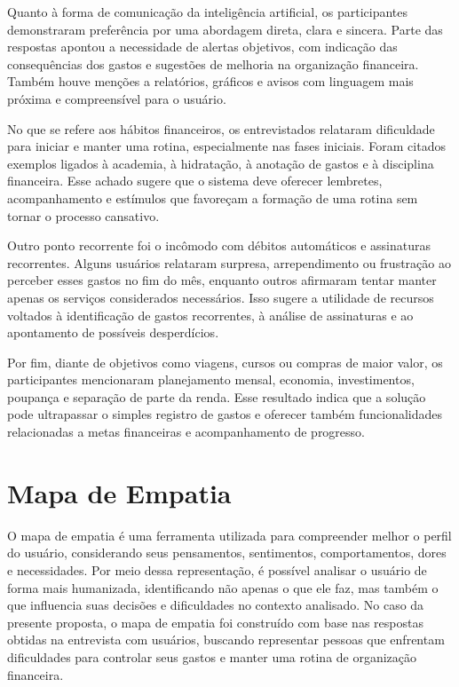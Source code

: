 Quanto à forma de comunicação da inteligência artificial, os participantes demonstraram preferência por uma abordagem direta, clara e sincera. Parte das respostas apontou a necessidade de alertas objetivos, com indicação das consequências dos gastos e sugestões de melhoria na organização financeira. Também houve menções a relatórios, gráficos e avisos com linguagem mais próxima e compreensível para o usuário.

No que se refere aos hábitos financeiros, os entrevistados relataram dificuldade para iniciar e manter uma rotina, especialmente nas fases iniciais. Foram citados exemplos ligados à academia, à hidratação, à anotação de gastos e à disciplina financeira. Esse achado sugere que o sistema deve oferecer lembretes, acompanhamento e estímulos que favoreçam a formação de uma rotina sem tornar o processo cansativo.

Outro ponto recorrente foi o incômodo com débitos automáticos e assinaturas recorrentes. Alguns usuários relataram surpresa, arrependimento ou frustração ao perceber esses gastos no fim do mês, enquanto outros afirmaram tentar manter apenas os serviços considerados necessários. Isso sugere a utilidade de recursos voltados à identificação de gastos recorrentes, à análise de assinaturas e ao apontamento de possíveis desperdícios.

Por fim, diante de objetivos como viagens, cursos ou compras de maior valor, os participantes mencionaram planejamento mensal, economia, investimentos, poupança e separação de parte da renda. Esse resultado indica que a solução pode ultrapassar o simples registro de gastos e oferecer também funcionalidades relacionadas a metas financeiras e acompanhamento de progresso.

\section{Mapa de Empatia}

O mapa de empatia é uma ferramenta utilizada para compreender melhor o perfil do usuário, considerando seus pensamentos, sentimentos, comportamentos, dores e necessidades. Por meio dessa representação, é possível analisar o usuário de forma mais humanizada, identificando não apenas o que ele faz, mas também o que influencia suas decisões e dificuldades no contexto analisado. No caso da presente proposta, o mapa de empatia foi construído com base nas respostas obtidas na entrevista com usuários, buscando representar pessoas que enfrentam dificuldades para controlar seus gastos e manter uma rotina de organização financeira.

